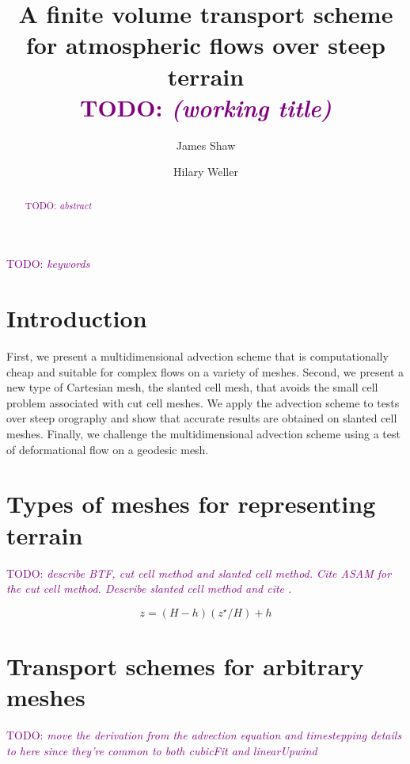 \documentclass[times]{elsarticle}
\newcommand{\TODO}[1]{\textcolor{purple}{TODO: \emph{#1}}}
\begin{document}
\begin{frontmatter}
\title{A finite volume transport scheme for atmospheric flows over steep terrain \\ \TODO{(working title)}}
\author[uor]{James Shaw}
\author[uor]{Hilary Weller}

\address[uor]{Department of Meteorology, University of Reading, Reading, United Kingdom}

\begin{abstract}
	\TODO{abstract}
\end{abstract}

\begin{keyword}
	\TODO{keywords}
\end{keyword}
\end{frontmatter}

\section{Introduction}

First, we present a multidimensional advection scheme that is computationally cheap and suitable for complex flows on a variety of meshes.  Second, we present a new type of Cartesian mesh, the slanted cell mesh, that avoids the small cell problem associated with cut cell meshes.   We apply the advection scheme to tests over steep orography and show that accurate results are obtained on slanted cell meshes.  Finally, we challenge the multidimensional advection scheme using a test of deformational flow on a geodesic mesh.

\section{Types of meshes for representing terrain}
\label{sec:meshes}

\TODO{describe BTF, cut cell method and slanted cell method.  Cite ASAM for the cut cell method.  Describe slanted cell method and cite \citep{shaw-weller2016}.}

\begin{equation}
	z = \left( H - h \right) \left( z^\star / H \right) + h \label{eqn:btf}
\end{equation}

\section{Transport schemes for arbitrary meshes}
\TODO{move the derivation from the advection equation and timestepping details to here since they're common to both cubicFit and linearUpwind}
\end{document}
